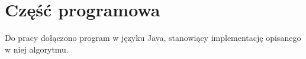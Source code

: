 \documentclass[brudnopis]{xmgr}
\begin{document}
\appendix
\chapter{Część programowa}

Do pracy dołączono program w języku Java, stanowiący implementację opisanego w niej algorytmu.





\listoffigures

\oswiadczenie
\end{document}
